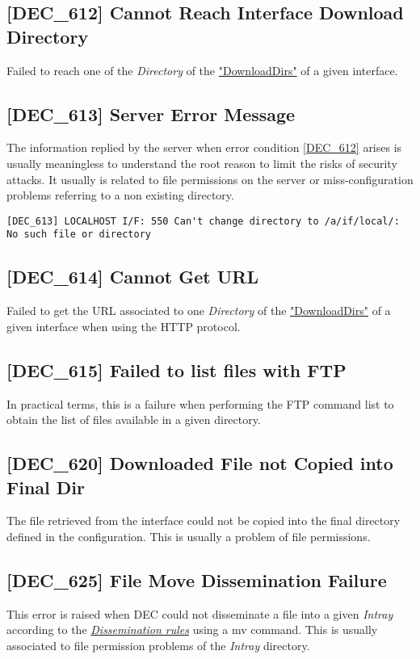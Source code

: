 \documentclass[dec_sum_main.tex]{subfiles}
\begin{document}
\subsection{[DEC\_612] Cannot Reach Interface Download Directory}
\label{DEC612}
Failed to reach one of the \textit{Directory} of the \hyperref[DownloadDirs]{"DownloadDirs"} of a given interface.

\subsection{[DEC\_613] Server Error Message }
The information replied by the server when error condition \hyperref[DEC612]{[DEC\_612]} arises is usually meaningless to understand the root reason to limit the risks of security attacks. It usually is related to file permissions on the server or miss-configuration problems referring to a non existing directory.
\begin{verbatim}
[DEC_613] LOCALHOST I/F: 550 Can't change directory to /a/if/local/: No such file or directory
\end{verbatim}

\label{DEC614}
\subsection{[DEC\_614] Cannot Get URL}
Failed to get the URL associated to one \textit{Directory} of the \hyperref[DownloadDirs]{"DownloadDirs"} of a given interface when using the HTTP protocol.

\label{DEC615}
\subsection{[DEC\_615] Failed to list files with FTP}
In practical terms, this is a failure when performing the FTP command list to obtain the list of files available in a given directory.

\subsection{[DEC\_620] Downloaded File not Copied into Final Dir}
\label{DEC620}
The file retrieved from the interface could not be copied into the final directory defined in the configuration. This is usually a problem of file permissions. 

\subsection{[DEC\_625] File Move Dissemination Failure}
\label{DEC625}
This error is raised when DEC could not disseminate a file into a given \textit{Intray} according to the \hyperref[Dissemination rules]{\textit{Dissemination rules}} using a mv command. This is usually associated to file permission problems of the \textit{Intray} directory.
\end{document}
